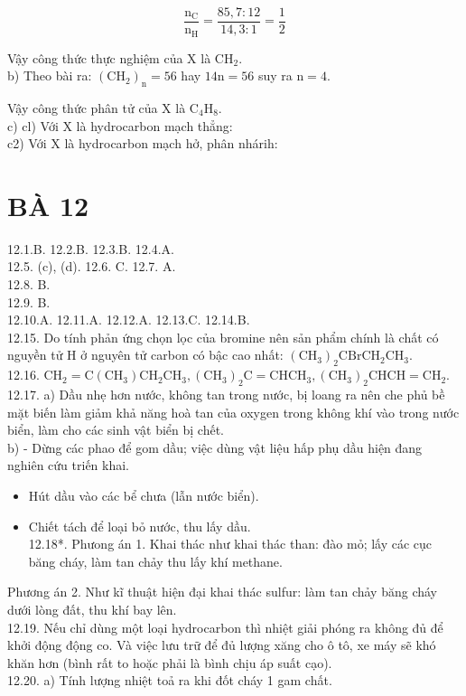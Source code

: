 \documentclass[10pt]{article}
\begin{document}
$$
\frac{\mathrm{n}_{\mathrm{C}}}{\mathrm{n}_{\mathrm{H}}}=\frac{85,7: 12}{14,3: 1}=\frac{1}{2}
$$

Vậy công thức thực nghiệm của X là $\mathrm{CH}_{2}$.\\
b) Theo bài ra: $\left(\mathrm{CH}_{2}\right)_{\mathrm{n}}=56$ hay $14 \mathrm{n}=56$ suy ra $\mathrm{n}=4$.

Vậy công thức phân tử của X là $\mathrm{C}_{4} \mathrm{H}_{8}$.\\
c) cl) Với X là hydrocarbon mạch thẳng:\\
c2) Với X là hydrocarbon mạch hở, phân nhárih:

\section*{BÀ 12}
12.1.B. 12.2.B. 12.3.B. 12.4.A.\\
12.5. (c), (d). 12.6. C. 12.7. A.\\
12.8. B.\\
12.9. B.\\
12.10.A. 12.11.A. 12.12.A. 12.13.C. 12.14.B.\\
12.15. Do tính phản ứng chọn lọc của bromine nên sản phẩm chính là chất có nguyền tử H ở nguyên tử carbon có bậc cao nhất: $\left(\mathrm{CH}_{3}\right)_{2} \mathrm{CBrCH}_{2} \mathrm{CH}_{3}$.\\
12.16. $\mathrm{CH}_{2}=\mathrm{C}\left(\mathrm{CH}_{3}\right) \mathrm{CH}_{2} \mathrm{CH}_{3},\left(\mathrm{CH}_{3}\right)_{2} \mathrm{C}=\mathrm{CHCH}_{3},\left(\mathrm{CH}_{3}\right)_{2} \mathrm{CHCH}=\mathrm{CH}_{2}$.\\
12.17. a) Dầu nhẹ hơn nước, không tan trong nước, bị loang ra nên che phủ bề mặt biến làm giảm khả năng hoà tan của oxygen trong không khí vào trong nước biển, làm cho các sinh vật biển bị chết.\\
b) - Dừng các phao để gom dầu; việc dùng vật liệu hấp phụ dầu hiện đang nghiên cứu triến khai.

\begin{itemize}
  \item Hút dầu vào các bể chưa (lẫn nước biển).
  \item Chiết tách để loại bỏ nước, thu lấy dầu.\\
12.18*. Phưong án 1. Khai thác như khai thác than: đào mỏ; lấy các cục băng cháy, làm tan chảy thu lấy khí methane.
\end{itemize}

Phương án 2. Như kĩ thuật hiện đại khai thác sulfur: làm tan chảy băng cháy dưới lòng đất, thu khí bay lên.\\
12.19. Nếu chỉ dùng một loại hydrocarbon thì nhiệt giải phóng ra không đủ để khởi động động co. Và việc lưu trữ để đủ lượng xăng cho ô tô, xe máy sẽ khó khăn hơn (bình rất to hoặc phải là bình chịu áp suất cạo).\\
12.20. a) Tính lượng nhiệt toả ra khi đốt cháy 1 gam chất.
\end{document}
